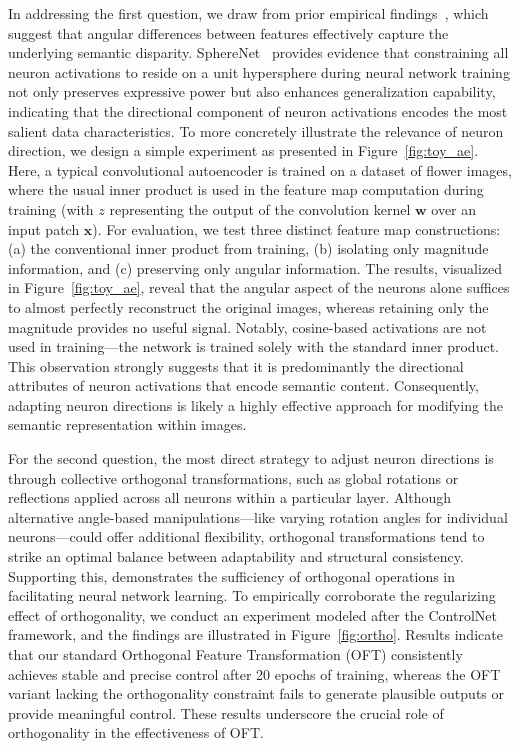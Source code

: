 In addressing the first question, we draw from prior empirical findings~\cite{liu2018decoupled,chen2020angular}, which suggest that angular differences between features effectively capture the underlying semantic disparity. SphereNet~\cite{liu2017deep} provides evidence that constraining all neuron activations to reside on a unit hypersphere during neural network training not only preserves expressive power but also enhances generalization capability, indicating that the directional component of neuron activations encodes the most salient data characteristics. To more concretely illustrate the relevance of neuron direction, we design a simple experiment as presented in Figure~\ref{fig:toy_ae}. Here, a typical convolutional autoencoder is trained on a dataset of flower images, where the usual inner product is used in the feature map computation during training (with $z$ representing the output of the convolution kernel $\bm{w}$ over an input patch $\bm{x}$). For evaluation, we test three distinct feature map constructions: (a) the conventional inner product from training, (b) isolating only magnitude information, and (c) preserving only angular information. The results, visualized in Figure~\ref{fig:toy_ae}, reveal that the angular aspect of the neurons alone suffices to almost perfectly reconstruct the original images, whereas retaining only the magnitude provides no useful signal. Notably, cosine-based activations are not used in training—the network is trained solely with the standard inner product. This observation strongly suggests that it is predominantly the directional attributes of neuron activations that encode semantic content. Consequently, adapting neuron directions is likely a highly effective approach for modifying the semantic representation within images.

For the second question, the most direct strategy to adjust neuron directions is through collective orthogonal transformations, such as global rotations or reflections applied across all neurons within a particular layer. Although alternative angle-based manipulations—like varying rotation angles for individual neurons—could offer additional flexibility, orthogonal transformations tend to strike an optimal balance between adaptability and structural consistency. Supporting this, \cite{liu2021orthogonal} demonstrates the sufficiency of orthogonal operations in facilitating neural network learning. To empirically corroborate the regularizing effect of orthogonality, we conduct an experiment modeled after the ControlNet~\cite{zhang2023adding} framework, and the findings are illustrated in Figure~\ref{fig:ortho}. Results indicate that our standard Orthogonal Feature Transformation (OFT) consistently achieves stable and precise control after 20 epochs of training, whereas the OFT variant lacking the orthogonality constraint fails to generate plausible outputs or provide meaningful control. These results underscore the crucial role of orthogonality in the effectiveness of OFT.

